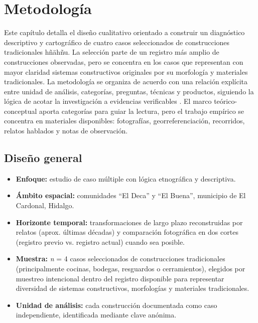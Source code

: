 \section{Metodología}

Este capítulo detalla el diseño cualitativo orientado a construir un diagnóstico descriptivo y cartográfico de cuatro casos seleccionados de construcciones tradicionales hñähñu. La selección parte de un registro más amplio de construcciones observadas, pero se concentra en los casos que representan con mayor claridad sistemas constructivos originales por su morfología y materiales tradicionales. La metodología se organiza de acuerdo con una relación explícita entre unidad de análisis, categorías, preguntas, técnicas y productos, siguiendo la lógica de acotar la investigación a evidencias verificables \citep{guerrerobaca2025propuesta}. El marco teórico-conceptual aporta categorías para guiar la lectura, pero el trabajo empírico se concentra en materiales disponibles: fotografías, georreferenciación, recorridos, relatos hablados y notas de observación.

\subsection{Diseño general}

\begin{itemize}
	\item \textbf{Enfoque:} estudio de caso múltiple con lógica etnográfica
	      y descriptiva.
	\item \textbf{Ámbito espacial:} comunidades ``El Deca'' y ``El Buena'',
	      municipio de El Cardonal, Hidalgo.
	\item \textbf{Horizonte temporal:} transformaciones de largo plazo
	      reconstruidas por relatos (aprox.
	      últimas décadas) y comparación fotográfica en dos cortes
	      (registro previo vs. registro actual) cuando sea posible.
	\item \textbf{Muestra:} \emph{n} = 4 casos seleccionados de construcciones tradicionales
	      (principalmente cocinas, bodegas, resguardos o cerramientos), elegidos por muestreo
	      intencional dentro del registro disponible para representar diversidad de sistemas constructivos,
	      morfologías y materiales tradicionales.
    \item \textbf{Unidad de análisis:} cada construcción documentada como caso independiente, identificada mediante clave anónima.
\end{itemize}

